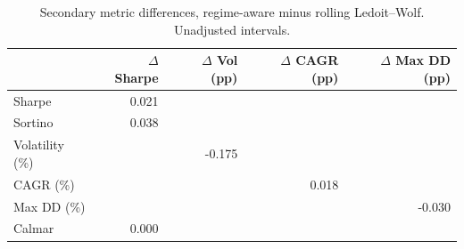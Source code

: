 \begin{table}[htbp]
\caption{Secondary metric differences, regime-aware minus rolling Ledoit--Wolf. Unadjusted intervals.}
\label{tab:table3_secondary_intervals}
\small
\begin{tabular}{lrrrr}
\toprule
 & $\Delta$ Sharpe & $\Delta$ Vol (pp) & $\Delta$ CAGR (pp) & $\Delta$ Max DD (pp) \\
\midrule
Sharpe & 0.021 &  &  &  \\
Sortino & 0.038 &  &  &  \\
Volatility (\%) &  & -0.175 &  &  \\
CAGR (\%) &  &  & 0.018 &  \\
Max DD (\%) &  &  &  & -0.030 \\
Calmar & 0.000 &  &  &  \\
\bottomrule
\end{tabular}
\end{table}
